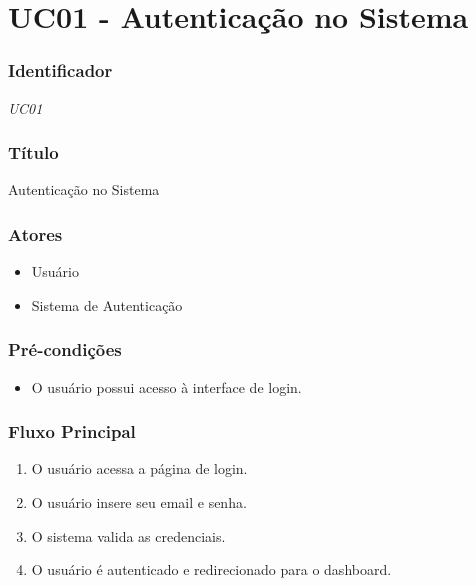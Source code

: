 \chapter{UC01 - Autenticação no Sistema}
\label{apendiceUC01}

\subsection*{Identificador}
\textit{UC01}

\subsection*{Título}
Autenticação no Sistema

\subsection*{Atores}
\begin{addmargin}[1.5cm]{0cm}
	\begin{itemize}
		\item Usuário
		\item Sistema de Autenticação
	\end{itemize}
\end{addmargin}

\subsection*{Pré-condições}
\begin{addmargin}[1.5cm]{0cm}
	\begin{itemize}
		\item O usuário possui acesso à interface de login.
	\end{itemize}
\end{addmargin}

\subsection*{Fluxo Principal}
\begin{addmargin}[1.5cm]{0cm}
	\begin{enumerate}
		\item O usuário acessa a página de login.
		\item O usuário insere seu email e senha.
		\item O sistema valida as credenciais.
		\item O usuário é autenticado e redirecionado para o dashboard.
	\end{enumerate}
\end{addmargin}

